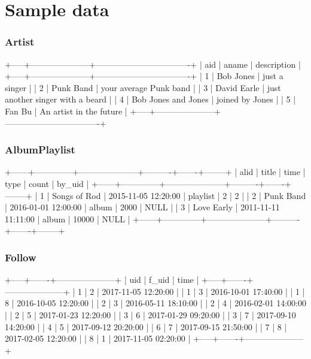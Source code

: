 \documentclass[letterpaper, 12pt]{report}
\begin{document}
	\section{Sample data}
	\subsubsection{Artist}
	\begin{spverbatim}
		+-----+---------------------+----------------------------------+
		| aid | aname               | description                      |
		+-----+---------------------+----------------------------------+
		|   1 | Bob Jones           | just a singer                    |
		|   2 | Punk Band           | your average Punk band           |
		|   3 | David Earle         | just another singer with a beard |
		|   4 | Bob Jones and Jones | joined by Jones                  |
		|   5 | Fan Bu              | An artist in the future          |
		+-----+---------------------+----------------------------------+
	\end{spverbatim}

	\subsubsection{AlbumPlaylist}
	\begin{spverbatim}
		+------+--------------+---------------------+----------+-------+--------+
		| alid | title        | time                | type     | count | by_uid |
		+------+--------------+---------------------+----------+-------+--------+
		|    1 | Songs of Rod | 2015-11-05 12:20:00 | playlist |     2 |      2 |
		|    2 | Punk Band    | 2016-01-01 12:00:00 | album    |  2000 | NULL   |
		|    3 | Love Early   | 2011-11-11 11:11:00 | album    | 10000 | NULL   |
		+------+--------------+---------------------+----------+-------+--------+
	\end{spverbatim}

	\subsubsection{Follow}
	\begin{spverbatim}
		+-----+-------+---------------------+
		| uid | f_uid | time                |
		+-----+-------+---------------------+
		|   1 |     2 | 2017-11-05 12:20:00 |
		|   1 |     3 | 2016-10-01 17:40:00 |
		|   1 |     8 | 2016-10-05 12:20:00 |
		|   2 |     3 | 2016-05-11 18:10:00 |
		|   2 |     4 | 2016-02-01 14:00:00 |
		|   2 |     5 | 2017-01-23 12:20:00 |
		|   3 |     6 | 2017-01-29 09:20:00 |
		|   3 |     7 | 2017-09-10 14:20:00 |
		|   4 |     5 | 2017-09-12 20:20:00 |
		|   6 |     7 | 2017-09-15 21:50:00 |
		|   7 |     8 | 2017-02-05 12:20:00 |
		|   8 |     1 | 2017-11-05 02:20:00 |
		+-----+-------+---------------------+
	\end{spverbatim}
\end{document}
